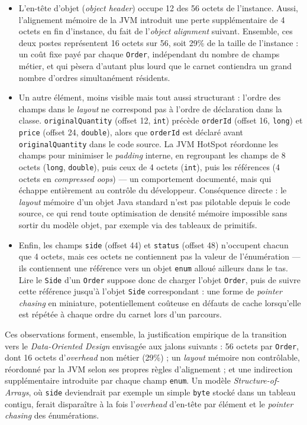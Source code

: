 \begin{itemize}
    \item L'en-tête d'objet (\textit{object header}) occupe 12 des 56 octets de l'instance. Aussi, l'alignement mémoire de la JVM introduit une perte supplémentaire de 4 octets en fin d'instance, du fait de l'\textit{object alignment} suivant. Ensemble, ces deux postes représentent 16 octets sur 56, soit 29\% de la taille de l'instance : un coût fixe payé par chaque \texttt{Order}, indépendant du nombre de champs métier, et qui pèsera d'autant plus lourd que le carnet contiendra un grand nombre d'ordres simultanément résidents.
    \item Un autre élément, moins visible mais tout aussi structurant : l'ordre des champs dans le \textit{layout} ne correspond pas à l'ordre de déclaration dans la classe. \texttt{originalQuantity} (offset 12, \texttt{int}) précède \texttt{orderId} (offset 16, \texttt{long}) et \texttt{price} (offset 24, \texttt{double}), alors que \texttt{orderId} est déclaré avant \texttt{originalQuantity} dans le code source. La JVM HotSpot réordonne les champs pour minimiser le \textit{padding} interne, en regroupant les champs de 8 octets (\texttt{long}, \texttt{double}), puis ceux de 4 octets (\texttt{int}), puis les références (4 octets en \textit{compressed oops}) — un comportement documenté, mais qui échappe entièrement au contrôle du développeur. Conséquence directe : le \textit{layout} mémoire d'un objet Java standard n'est pas pilotable depuis le code source, ce qui rend toute optimisation de densité mémoire impossible sans sortir du modèle objet, par exemple via des tableaux de primitifs.
    \item Enfin, les champs \texttt{side} (offset 44) et \texttt{status} (offset 48) n'occupent chacun que 4 octets, mais ces octets ne contiennent pas la valeur de l'énumération — ils contiennent une référence vers un objet \texttt{enum} alloué ailleurs dans le tas. Lire le \texttt{Side} d'un \texttt{Order} suppose donc de charger l'objet \texttt{Order}, puis de suivre cette référence jusqu'à l'objet \texttt{Side} correspondant : une forme de \textit{pointer chasing} en miniature, potentiellement coûteuse en défauts de cache lorsqu'elle est répétée à chaque ordre du carnet lors d'un parcours.
\end{itemize}

Ces observations forment, ensemble, la justification empirique de la transition vers le \textit{Data-Oriented Design} envisagée aux jalons suivants : 56 octets par \texttt{Order}, dont 16 octets d'\textit{overhead} non métier (29\%) ; un \textit{layout} mémoire non contrôlable, réordonné par la JVM selon ses propres règles d'alignement ; et une indirection supplémentaire introduite par chaque champ \texttt{enum}. Un modèle \textit{Structure-of-Arrays}, où \texttt{side} deviendrait par exemple un simple \texttt{byte} stocké dans un tableau contigu, ferait disparaître à la fois l'\textit{overhead} d'en-tête par élément et le \textit{pointer chasing} des énumérations.

